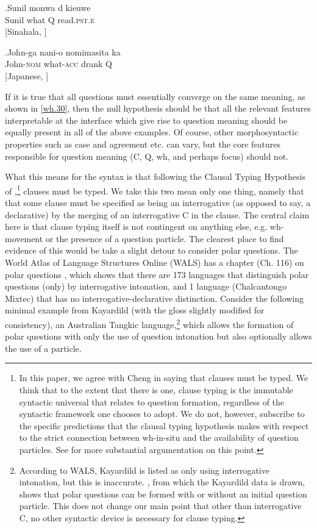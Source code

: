 \documentclass[11pt]{article}
\begin{document}
\exg.\label{wh.90}Sunil mon{\textschwa}wa {d\textschwa} kieuwe \\
  Sunil what Q read.\textsc{pst.e} \\
  \hspace{\fill}[Sinahala, \cite{slade:2011}]

\exg.\label{wh.100}John-ga nani-o nomimasita ka \\
  John-\textsc{nom} what-\textsc{acc} drank Q \\
  \hspace{\fill}[Japanese, \cite{hagstrom:1998}]

If it is true that all questions must essentially converge on the same meaning, as shown in \ref{wh.30}, then the null hypothesis should be that all the relevant features interpretable at the interface which give rise to question meaning should be equally present in all of the above examples. Of course, other morphosyntactic properties such as case and agreement etc. can vary, but the core features responsible for question meaning (C, Q, wh, and perhaps focus) should not.

What this means for the syntax is that following the Clausal Typing Hypothesis of \cite{cheng:1997},\footnote{In this paper, we agree with Cheng in saying that clauses must be typed. We think that to the extent that there is one, clause typing is the immutable syntactic universal that relates to question formation, regardless of the syntactic framework one chooses to adopt. We do not, however, subscribe to the specific predictions that the clausal typing hypothesis makes with respect to the strict connection between wh-in-situ and the availability of question particles. See \cite{bruening:07} for more substantial argumentation on this point.} clauses must be typed. We take this two mean only one thing, namely that that some clause must be specified as being an interrogative (as opposed to say, a declarative) by the merging of an interrogative C in the clause. The central claim here is that clause typing itself is not contingent on anything else, e.g. wh-movement or the presence of a question particle. The clearest place to find evidence of this would be take a slight detour to consider polar questions. The World Atlas of Language Structures Online (WALS) has a chapter (Ch. 116) on polar questions \citep{wals116:2013}, which shows that there are 173 languages that distinguish polar questions (only) by interrogative intonation, and 1 language (Chalcantongo Mixtec) that has no interrogative-declarative distinction. Consider the following minimal example from Kayardild (with the gloss slightly modified for consistency), an Australian Tangkic language,\footnote{According to WALS, Kayardild is listed as only using interrogative intonation, but this is inaccurate. \cite{evans:1995}, from which the Kayardild data is drawn, shows that polar questions can be formed with or without an initial question particle. This does not change our main point that other than interrogative C, no other syntactic device is necessary for clause typing.} which allows the formation of polar questions with only the use of question intonation but also optionally allows the use of a particle.
\end{document}
